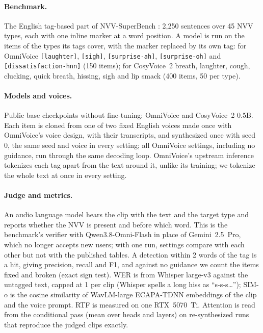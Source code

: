 \documentclass[11pt]{article}
\newcommand{\tg}[1]{\texttt{[#1]}}
\begin{document}
\paragraph{Benchmark.} The English tag-based part of NVV-SuperBench \citep{xue2026nvvsuperbench}: 2,250 sentences over 45 NVV types, each with one inline marker at a word position. A model is run on the items of the types its tags cover, with the marker replaced by its own tag: for OmniVoice \tg{laughter}, \tg{sigh}, \tg{surprise-ah}, \tg{surprise-oh} and \tg{dissatisfaction-hnn} (150 items); for CosyVoice~2 breath, laughter, cough, clucking, quick breath, hissing, sigh and lip smack (400 items, 50 per type).

\paragraph{Models and voices.} Public base checkpoints without fine-tuning: OmniVoice and CosyVoice~2 0.5B. Each item is cloned from one of two fixed English voices made once with OmniVoice's voice design, with their transcripts, and synthesized once with seed 0, the same seed and voice in every setting; all OmniVoice settings, including no guidance, run through the same decoding loop. OmniVoice's upstream inference tokenizes each tag apart from the text around it, unlike its training; we tokenize the whole text at once in every setting.

\paragraph{Judge and metrics.} An audio language model hears the clip with the text and the target type and reports whether the NVV is present and before which word. This is the benchmark's verifier with Qwen3.8-Omni-Flash \citep{qwen2025omni} in place of Gemini~2.5~Pro, which no longer accepts new users; with one run, settings compare with each other but not with the published tables. A detection within 2 words of the tag is a hit, giving precision, recall and F1, and against no guidance we count the items fixed and broken (exact sign test). WER is from Whisper large-v3 \citep{radford2023whisper} against the untagged text, capped at 1 per clip (Whisper spells a long hiss as ``s-s-s\ldots''); SIM-o is the cosine similarity of WavLM-large \citep{chen2022wavlm} ECAPA-TDNN \citep{desplanques2020ecapa} embeddings of the clip and the voice prompt. RTF is measured on one RTX~5070~Ti. Attention is read from the conditional pass (mean over heads and layers) on re-synthesized runs that reproduce the judged clips exactly.
\end{document}
